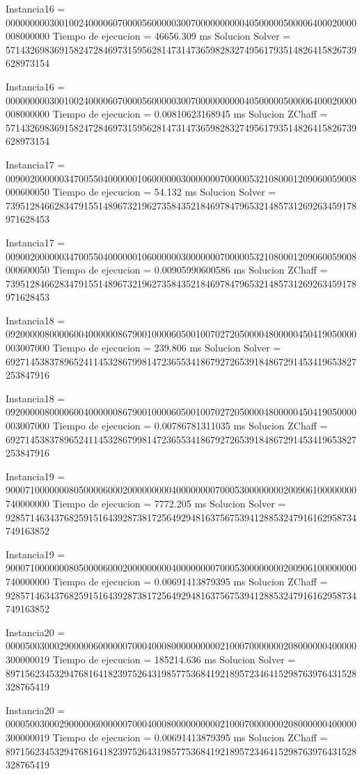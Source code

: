 Instancia16 = 000000000300100240000607000056000003007000000000040500000500006400020000008000000
Tiempo de ejecucion = 46656.309 ms
Solucion Solver = 571432698369158247284697315956281473147365982832749561793514826415826739628973154

Instancia16 = 000000000300100240000607000056000003007000000000040500000500006400020000008000000
Tiempo de ejecucion = 0.00810623168945 ms
Solucion ZChaff = 571432698369158247284697315956281473147365982832749561793514826415826739628973154

Instancia17 = 009002000000347005504000000106000000300000007000005321080001209060059008000600050
Tiempo de ejecucion = 54.132 ms
Solucion Solver = 739512846628347915514896732196273584352184697847965321485731269263459178971628453

Instancia17 = 009002000000347005504000000106000000300000007000005321080001209060059008000600050
Tiempo de ejecucion = 0.00905990600586 ms
Solucion ZChaff = 739512846628347915514896732196273584352184697847965321485731269263459178971628453

Instancia18 = 092000008000060040000008679001000060500100702720500004800000450419050000003007000
Tiempo de ejecucion = 239.806 ms
Solucion Solver = 692714538378965241145328679981472365534186792726539184867291453419653827253847916

Instancia18 = 092000008000060040000008679001000060500100702720500004800000450419050000003007000
Tiempo de ejecucion = 0.00786781311035 ms
Solucion ZChaff = 692714538378965241145328679981472365534186792726539184867291453419653827253847916

Instancia19 = 900071000000080500006000200000000040000000070005300000000200906100000000740000000
Tiempo de ejecucion = 7772.205 ms
Solucion Solver = 928571463437682591516439287381725649294816375675394128853247916162958734749163852

Instancia19 = 900071000000080500006000200000000040000000070005300000000200906100000000740000000
Tiempo de ejecucion = 0.00691413879395 ms
Solucion ZChaff = 928571463437682591516439287381725649294816375675394128853247916162958734749163852

Instancia20 = 000050030002900000600000070004000800000000002100070000000208000000400000300000019
Tiempo de ejecucion = 185214.636 ms
Solucion Solver = 897156234532947681641823975264319857753684192189572346415298763976431528328765419

Instancia20 = 000050030002900000600000070004000800000000002100070000000208000000400000300000019
Tiempo de ejecucion = 0.00691413879395 ms
Solucion ZChaff = 897156234532947681641823975264319857753684192189572346415298763976431528328765419

